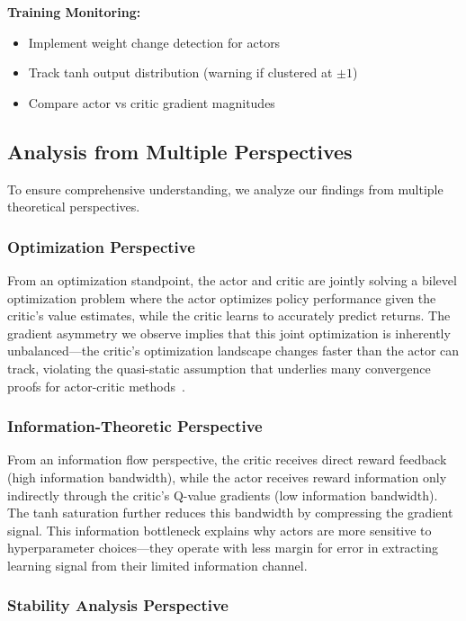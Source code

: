 \textbf{Training Monitoring:}
\begin{itemize}
    \item Implement weight change detection for actors
    \item Track tanh output distribution (warning if clustered at $\pm 1$)
    \item Compare actor vs critic gradient magnitudes
\end{itemize}

\subsection{Analysis from Multiple Perspectives}

To ensure comprehensive understanding, we analyze our findings from multiple theoretical perspectives.

\subsubsection{Optimization Perspective}

From an optimization standpoint, the actor and critic are jointly solving a bilevel optimization problem where the actor optimizes policy performance given the critic's value estimates, while the critic learns to accurately predict returns. The gradient asymmetry we observe implies that this joint optimization is inherently unbalanced---the critic's optimization landscape changes faster than the actor can track, violating the quasi-static assumption that underlies many convergence proofs for actor-critic methods~\cite{konda2000actor}.

\subsubsection{Information-Theoretic Perspective}

From an information flow perspective, the critic receives direct reward feedback (high information bandwidth), while the actor receives reward information only indirectly through the critic's Q-value gradients (low information bandwidth). The tanh saturation further reduces this bandwidth by compressing the gradient signal. This information bottleneck explains why actors are more sensitive to hyperparameter choices---they operate with less margin for error in extracting learning signal from their limited information channel.

\subsubsection{Stability Analysis Perspective}

